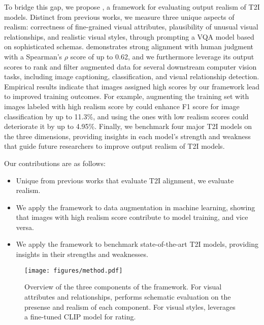 To bridge this gap, we propose \name, a framework for evaluating output realism of T2I models. Distinct from previous works, we measure three unique aspects of realism: correctness of fine-grained visual attributes, plausibility of unusual visual relationships, and realistic visual styles, through prompting a VQA model based on sophisticated schemas.
\name demonstrates strong alignment with human judgment with a Spearman's $\rho$ score of up to 0.62, and we furthermore leverage its output scores to rank and filter augmented data for several downstream computer vision tasks, including image captioning, classification, and visual relationship detection. Empirical results indicate that images assigned high scores by our framework lead to improved training outcomes. For example, augmenting the training set with images labeled with high realism score by \name could enhance F1 score for image classification by up to 11.3\%, and using the ones with low realism scores could deteriorate it by up to 4.95\%. Finally, we benchmark four major T2I models on the three dimensions, providing insights in each model's strength and weakness that guide future researchers to improve output realism of T2I models.

Our contributions are as follows:
\begin{itemize}
    \item Unique from previous works that evaluate T2I alignment, we evaluate realism.
    \item We apply the \name framework to data augmentation in machine learning, showing that images with high realism score contribute to model training, and vice versa.
    \item We apply the \name framework to benchmark state-of-the-art T2I models, providing insights in their strengths and weaknesses.
\end{itemize}

\begin{figure*}[ht!]
    \centering
    \texttt{[image: figures/method.pdf]}
    \caption{Overview of the three components of the \name framework. For visual attributes and relationships, \name performs schematic evaluation on the presense and realism of each component. For visual styles, \name leverages a fine-tuned CLIP model for rating.}
    \label{fig:method}
\end{figure*}
